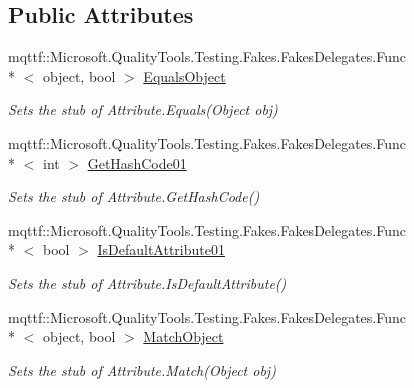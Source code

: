 \subsection*{Public Attributes}
\begin{DoxyCompactItemize}
\item 
mqttf\-::\-Microsoft.\-Quality\-Tools.\-Testing.\-Fakes.\-Fakes\-Delegates.\-Func\\*
$<$ object, bool $>$ \hyperlink{class_system_1_1_runtime_1_1_compiler_services_1_1_fakes_1_1_stub_custom_constant_attribute_ad6fe622b0b81d2f93c0c7b753257330c}{Equals\-Object}
\begin{DoxyCompactList}\small\item\em Sets the stub of Attribute.\-Equals(\-Object obj)\end{DoxyCompactList}\item 
mqttf\-::\-Microsoft.\-Quality\-Tools.\-Testing.\-Fakes.\-Fakes\-Delegates.\-Func\\*
$<$ int $>$ \hyperlink{class_system_1_1_runtime_1_1_compiler_services_1_1_fakes_1_1_stub_custom_constant_attribute_a952331c31561b4af1d1609a8a69a75a2}{Get\-Hash\-Code01}
\begin{DoxyCompactList}\small\item\em Sets the stub of Attribute.\-Get\-Hash\-Code()\end{DoxyCompactList}\item 
mqttf\-::\-Microsoft.\-Quality\-Tools.\-Testing.\-Fakes.\-Fakes\-Delegates.\-Func\\*
$<$ bool $>$ \hyperlink{class_system_1_1_runtime_1_1_compiler_services_1_1_fakes_1_1_stub_custom_constant_attribute_a34c01ab1967d46a5a814fe3296c781d0}{Is\-Default\-Attribute01}
\begin{DoxyCompactList}\small\item\em Sets the stub of Attribute.\-Is\-Default\-Attribute()\end{DoxyCompactList}\item 
mqttf\-::\-Microsoft.\-Quality\-Tools.\-Testing.\-Fakes.\-Fakes\-Delegates.\-Func\\*
$<$ object, bool $>$ \hyperlink{class_system_1_1_runtime_1_1_compiler_services_1_1_fakes_1_1_stub_custom_constant_attribute_adf93cba4ade96866bb7a1d995c876664}{Match\-Object}
\begin{DoxyCompactList}\small\item\em Sets the stub of Attribute.\-Match(\-Object obj)\end{DoxyCompactList}\item 

\end{DoxyCompactItemize}
